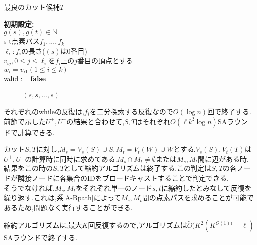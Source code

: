 \documentclass{thesis}
\theoremstyle{definition}
\begin{document}
\begin{algorithm}[H]
  \caption{最良のカット候補$T$} 
  \textbf{初期設定:} \\
  $g(s),g(t)\in \mathbb{N}$ \\
  s-t点素パス$f_1,...,f_k$ \\
  $\ell_i:f_i$の長さ($(s)$は0番目) \\
  $v_{ij},0 \leq j \leq \ell_i$を$f_i$上の$j$番目の頂点とする \\
  $w_i=v_{i1}(1\leq i \leq k)$ \\
  valid := \textbf{false} \\ 
  {\setlength{\baselineskip}{12pt}
  \begin{algorithmic}[1]
       
       
           
           
          \Else
          \EndIf　
          \EndWhile　
    \EndFor
    \Else
     $(s,s,...,s)$
    \EndIf
  \end{algorithmic}
  }
\end{algorithm}

それぞれのwhileの反復は,$f_i$を二分探索する反復なので$O(\log n)$回で終了する.前節で示した$U^+,U^-$の結果と合わせて,$S,T$はそれぞれ$O(\ell k^2 \log n)$SAラウンドで計算できる.\par
カット$S,T$に対し,$M_s = V_s(S) \cup S,M_t = V_t(W) \cup W$とする.$V_s(S),V_t(T)$は$U^+,U^-$の計算時に同時に求めてある.$M_s \cap M_t \neq \emptyset $または$M_s,M_t$間に辺がある時,結果をこの時の$S,T$として縮約アルゴリズムは終了する.この判定は$S,T$の各ノードが隣接ノードに各集合のIDをブロードキャストすることで判定できる.\\
そうでなければ,$M_s,M_t$をそれぞれ単一のノード$s,t$に縮約したとみなして反復を繰り返す.これは,系\ref{A-Bpath}によって$M_s,M_t$間の点素パスを求めることが可能であるため,問題なく実行することができる.\par
縮約アルゴリズムは,最大$K$回反復するので,アルゴリズムは$\tilde{O}(K^2(K^{O(1))}+\ell)$SAラウンドで終了する.
\end{document}
